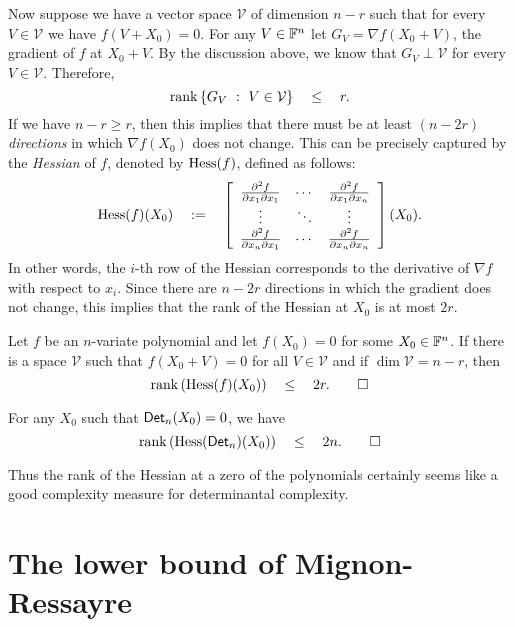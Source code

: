 Now suppose we have a vector space $\mathcal{V}$ of dimension $n-r$ such that for every $V \in \mathcal{V}$ we have $f(V + X_0) = 0$. For any $V\in \mathbb{F}^n$ let $G_V = \nabla f (X_0 + V)$, the gradient of $f$ at $X_0 + V$. By the discussion above, we know that $G_V \perp \mathcal{V}$ for every $V\in \mathcal{V}$. Therefore, \[
\operatorname{rank}\left\{{G_V}\ : \ {V \in \mathcal{V}}\right\} \quad \leq \quad r.
\]
If we have $n - r \geq r$, then this implies that there must be at least $(n - 2r)$ \emph{directions} in which $\nabla f (X_0)$ does not change. This can be precisely captured by the \emph{Hessian} of $f$, denoted by $\operatorname{Hess}(f)$, defined as follows:
\[
\operatorname{Hess}(f) (X_0) \quad := \quad \left[
\begin{array}{ccc}
\frac{\partial^2 f}{\partial x_1 \partial x_1} & \cdots & \frac{\partial^2 f}{\partial x_1 \partial x_n}\\
\vdots & \ddots & \vdots \\
\frac{\partial^2 f}{\partial x_n \partial x_1} & \cdots & \frac{\partial^2 f}{\partial x_n \partial x_n}\\
\end{array}\right] (X_0).
\]
In other words, the $i$-th row of the Hessian corresponds to the derivative of $\nabla f$ with respect to $x_i$. Since there are $n-2r$ directions in which the gradient does not change, this implies that the rank of the Hessian at $X_0$ is at most $2r$.

\begin{lemmawp}\label{lem:hess-large-perturbations}
Let $f$ be an $n$-variate polynomial and let $f(X_0) = 0$ for some $X_0 \in \mathbb{F}^n$. If there is a space $\mathcal{V}$ such that $f(X_0 + V) = 0$ for all $V \in \mathcal{V}$ and if $\dim \mathcal{V} = n - r$, then
\[
\operatorname{rank}\left(\operatorname{Hess}(f)(X_0)\right) \quad \leq \quad 2r. \qedhere
\]
\end{lemmawp}

\begin{corollarywp}\label{cor:hess-det}
For any $X_0$ such that $\operatorname{\mathsf{Det}}_n(X_0) = 0$, we have
\[
\operatorname{rank}\left(\operatorname{Hess}(\operatorname{\mathsf{Det}}_n)(X_0)\right) \quad \leq \quad 2n. \qedhere
\]
\end{corollarywp}

Thus the rank of the Hessian at a zero of the polynomials certainly seems like a good complexity measure for determinantal complexity. 

\section{The lower bound of Mignon-Ressayre}

